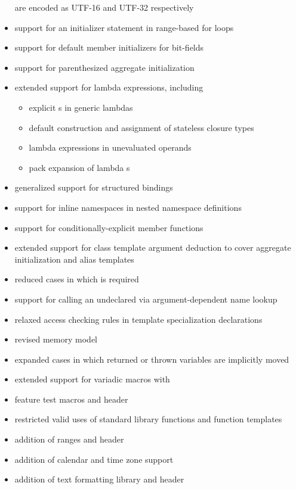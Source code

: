 \begin{itemize}
are encoded as UTF-16 and UTF-32 respectively
\item support for an initializer statement in range-based for loops
\item support for default member initializers for bit-fields
\item support for parenthesized aggregate initialization
\item extended support for lambda expressions, including
\begin{itemize}
  \item explicit s in generic lambdas
  \item default construction and assignment of stateless closure types
  \item lambda expressions in unevaluated operands
  \item pack expansion of lambda s
\end{itemize}
\item generalized support for structured bindings
\item support for inline namespaces in nested namespace definitions
\item support for conditionally-explicit member functions
\item extended support for class template argument deduction to cover
aggregate initialization and alias templates
\item reduced cases in which  is required
\item support for calling an undeclared 
via argument-dependent name lookup
\item relaxed access checking rules in template specialization declarations
\item revised memory model
\item expanded cases in which returned or thrown variables are implicitly moved
\item extended support for variadic macros with 
\item feature test macros and  header
\item restricted valid uses of standard library functions and function templates
\item addition of ranges and  header
\item addition of calendar and time zone support
\item addition of text formatting library and  header

\end{itemize}
